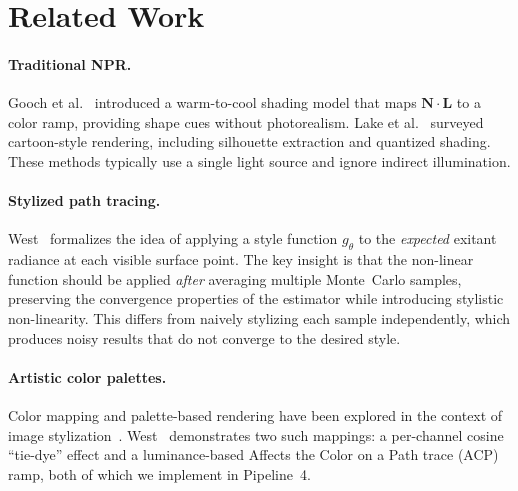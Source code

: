 \documentclass{article}
\begin{document}
\section{Related Work}
\label{sec:related}

\paragraph{Traditional NPR.}
Gooch et al.~\cite{gooch1998non} introduced a warm-to-cool shading model that maps $\mathbf{N} \cdot \mathbf{L}$ to a color ramp, providing shape cues without photorealism. Lake et al.~\cite{lake2000stylized} surveyed cartoon-style rendering, including silhouette extraction and quantized shading. These methods typically use a single light source and ignore indirect illumination.

\paragraph{Stylized path tracing.}
West~\cite{west2024stylized} formalizes the idea of applying a style function $g_\theta$ to the \emph{expected} exitant radiance at each visible surface point. The key insight is that the non-linear function should be applied \emph{after} averaging multiple Monte~Carlo samples, preserving the convergence properties of the estimator while introducing stylistic non-linearity. This differs from naively stylizing each sample independently, which produces noisy results that do not converge to the desired style.

\paragraph{Artistic color palettes.}
Color mapping and palette-based rendering have been explored in the context of image stylization~\cite{reinhard2001color}. West~\cite{west2024stylized} demonstrates two such mappings: a per-channel cosine ``tie-dye'' effect and a luminance-based Affects the Color on a Path trace (ACP)~\cite{doi2021global} ramp, both of which we implement in Pipeline~4.
\end{document}

